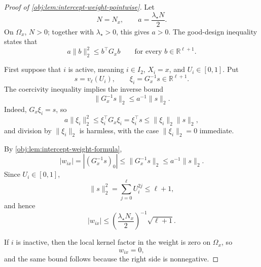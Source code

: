 \begin{proof}[Proof of \cref{obj:lem:intercept-weight-pointwise}]
Let
\[
N=N_x,\qquad
a=\frac{\lambda_\star N}{2}.
\]
On \(\Omega_x\), \(N>0\); together with \(\lambda_\star>0\), this gives \(a>0\).  The good-design inequality states that
\[
a\|b\|_2^2\le b^\top G_xb
\qquad\text{for every }b\in\mathbb R^{\ell+1}.
\]

First suppose that \(i\) is active, meaning \(i\in I_2\), \(X_i=x\), and \(U_i\in[0,1]\).  Put
\[
s=v_\ell(U_i),\qquad \xi_i=G_x^{-1}s\in\mathbb R^{\ell+1}.
\]
The coercivity inequality implies the inverse bound
\[
\|G_x^{-1}s\|_2\le a^{-1}\|s\|_2 .
\]
Indeed, \(G_x\xi_i=s\), so
\[
a\|\xi_i\|_2^2\le \xi_i^\top G_x\xi_i=\xi_i^\top s\le \|\xi_i\|_2\|s\|_2,
\]
and division by \(\|\xi_i\|_2\) is harmless, with the case \(\|\xi_i\|_2=0\) immediate. %

By \cref{obj:lem:intercept-weight-formula},
\[
|w_{ix}|
=
\left|(G_x^{-1}s)_0\right|
\le
\|G_x^{-1}s\|_2
\le
a^{-1}\|s\|_2 .
\]
Since \(U_i\in[0,1]\),
\[
\|s\|_2^2
=
\sum_{j=0}^{\ell}U_i^{2j}
\le
\ell+1,
\]
and hence
\[
|w_{ix}|
\le
\left(\frac{\lambda_\star N_x}{2}\right)^{-1}\sqrt{\ell+1}.
\]

If \(i\) is inactive, then the local kernel factor in the weight is zero on \(\Omega_x\), so
\[
w_{ix}=0,
\]
and the same bound follows because the right side is nonnegative. %
\end{proof}
